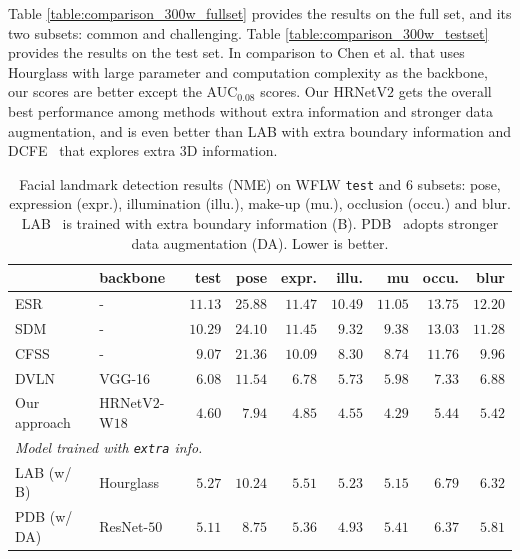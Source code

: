 \documentclass[10pt,journal,compsoc]{IEEEtran}
\begin{document}
Table \ref{table:comparison_300w_fullset} 
provides the results 
on the full set, and its two subsets:
common and challenging. 
Table \ref{table:comparison_300w_testset} provides the results
on the test set. 
In comparison to Chen et al. \cite{ChenSWLY17}
that uses Hourglass with large parameter and computation complexity
as the backbone,
our scores are better except the AUC$_{0.08}$ scores.
Our HRNetV$2$ gets the overall 
best performance among methods without extra information and stronger data augmentation, and is even better than LAB with extra boundary information and DCFE~\cite{ValleBVB18} that explores extra $3$D information.



\renewcommand{\arraystretch}{1.3}
\begin{table}[!htbp]
\scriptsize
\setlength{\tabcolsep}{13pt}
\centering
\caption{Facial landmark detection results 
(NME) on WFLW \texttt{test} and $6$ subsets: 
pose,
expression (expr.), 
illumination (illu.), 
make-up (mu.), 
occlusion (occu.)
and blur.
LAB~\cite{Wu0YWC018} is trained with extra boundary information (B).
PDB~\cite{FengKA0W18} adopts stronger data augmentation (DA).
Lower is better.}
\label{table:comparison_wflw_testset}
\begin{tabular}{l|l|r|r|r|r|r|r|r }
\hline \noalign{\smallskip}
   & backbone & test & pose & expr. & illu. & mu & occu. & blur\\
\hline

\hline
 ESR \cite{CaoWWS12}& - & $11.13$ & $25.88$ & $11.47$ & $10.49$ & $11.05$ & $13.75$ & $12.20$\\
SDM \cite{XiongT13}& - &$10.29$ & $24.10$ & $11.45$ & $9.32$ & $9.38$ & $13.03$ & $11.28$\\
CFSS \cite{ZhuLLT15}& - &$9.07$ & $21.36$ & $10.09$ & $8.30$ & $8.74$ & $11.76$ & $9.96$\\
DVLN \cite{WuY17} & VGG-16&$6.08$ & $11.54$ & $6.78$ & $5.73$ & $5.98$ & $7.33$ & $6.88$\\
\hline
Our approach & HRNetV$2$-W$18$ & $\mathbf{4.60}$ & $\mathbf{7.94}$ & $\mathbf{4.85}$ & $\mathbf{4.55}$ & $\mathbf{4.29}$ & $\mathbf{5.44}$ & $\mathbf{5.42}$\\
\hline

\hline
\multicolumn{3}{l}{
\emph {Model trained with \texttt{extra} info.}}\\
\hline
LAB (w/ B)~\cite{Wu0YWC018}& Hourglass & $5.27$ & $10.24$ & $5.51$ & $5.23$ & $5.15$ & $6.79$ & $6.32$\\
PDB (w/ DA)~\cite{FengKA0W18}& ResNet-$50$ & $5.11$ & $8.75$ & $5.36$ & $4.93$ & $5.41$ & $6.37$ & $5.81$\\
\hline
\end{tabular} 
\end{table}
\end{document}
